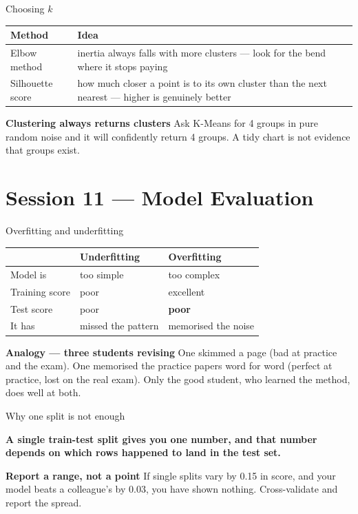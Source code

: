 \documentclass[10pt,aspectratio=169]{beamer}
\newcommand{\keyidea}[1]{%
  \begin{block}{}
  \centering\Large\bfseries\color{dsblue} #1
  \end{block}%
}
\newcommand{\trapbox}[2]{%
  \begin{alertblock}{\textbf{#1}}
  #2
  \end{alertblock}%
}
\newcommand{\analogybox}[2]{%
  \begin{exampleblock}{\textbf{Analogy --- #1}}
  #2
  \end{exampleblock}%
}
\begin{document}
\begin{frame}{Choosing $k$}
\begin{table}
\small
\begin{tabularx}{\linewidth}{@{}lX@{}}
\toprule
\textbf{Method} & \textbf{Idea} \\
\midrule
Elbow method & inertia always falls with more clusters --- look for the bend where it stops paying \\
Silhouette score & how much closer a point is to its own cluster than the next nearest --- higher is genuinely better \\
\bottomrule
\end{tabularx}
\end{table}
\trapbox{Clustering always returns clusters}{Ask K-Means for 4 groups in pure random noise and it will confidently return 4 groups. A tidy chart is not evidence that groups exist.}
\end{frame}

\section{Session 11 --- Model Evaluation}

\begin{frame}{Overfitting and underfitting}
\begin{table}
\small
\begin{tabularx}{\linewidth}{@{}lXX@{}}
\toprule
& \textbf{Underfitting} & \textbf{Overfitting} \\
\midrule
Model is & too simple & too complex \\
Training score & poor & excellent \\
Test score & poor & \textbf{poor} \\
It has & missed the pattern & memorised the noise \\
\bottomrule
\end{tabularx}
\end{table}
\analogybox{three students revising}{One skimmed a page (bad at practice and the exam). One memorised the practice papers word for word (perfect at practice, lost on the real exam). Only the good student, who learned the method, does well at both.}
\end{frame}

\begin{frame}{Why one split is not enough}
\keyidea{A single train-test split gives you one number, and that number depends on which rows happened to land in the test set.}
\trapbox{Report a range, not a point}{If single splits vary by 0.15 in score, and your model beats a colleague's by 0.03, you have shown nothing. Cross-validate and report the spread.}
\end{frame}
\end{document}
